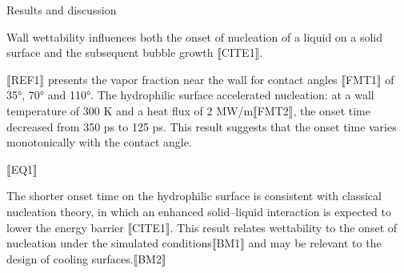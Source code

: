 Results and discussion

Wall wettability influences both the onset of nucleation of a liquid on a solid surface and the subsequent bubble growth ⟦CITE1⟧.

⟦REF1⟧ presents the vapor fraction near the wall for contact angles ⟦FMT1⟧ of 35°, 70° and 110°. The hydrophilic surface accelerated nucleation: at a wall temperature of 300 K and a heat flux of 2 MW/m⟦FMT2⟧, the onset time decreased from 350 ps to 125 ps. This result suggests that the onset time varies monotonically with the contact angle.

⟦EQ1⟧

The shorter onset time on the hydrophilic surface is consistent with classical nucleation theory, in which an enhanced solid–liquid interaction is expected to lower the energy barrier ⟦CITE1⟧. This result relates wettability to the onset of nucleation under the simulated conditions⟦BM1⟧ and may be relevant to the design of cooling surfaces.⟦BM2⟧